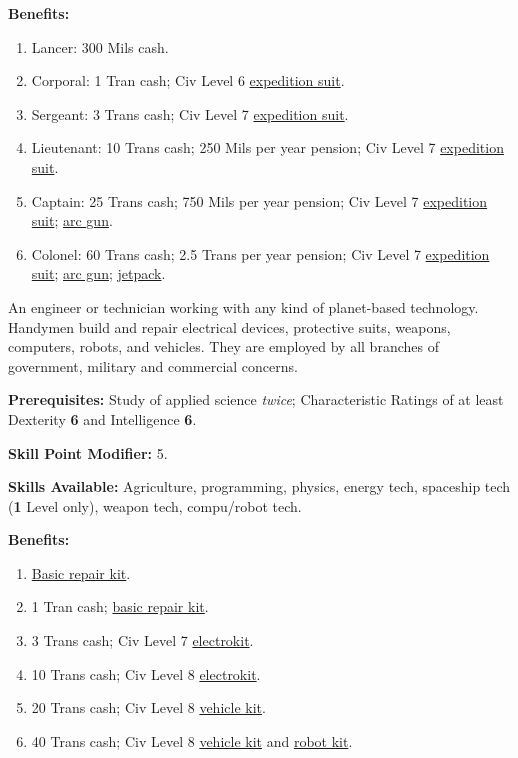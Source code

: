 \pagebreak[2]
\textbf{Benefits:}
\begin{enumerate}
\item Lancer: 300 Mils cash.
\item Corporal: 1 Tran cash; Civ Level 6 \hyperlink{tag:expedsuit}{expedition suit}.
\item Sergeant: 3 Trans cash; Civ Level 7 \hyperlink{tag:expedsuit}{expedition suit}.
\item Lieutenant: 10 Trans cash; 250 Mils per year pension; Civ Level
  7 \hyperlink{tag:expedsuit}{expedition suit}.
\item Captain: 25 Trans cash; 750 Mils per year pension; Civ Level 7
  \hyperlink{tag:expedsuit}{expedition suit}; \hyperlink{tag:arcgun}{arc gun}.
\item Colonel: 60 Trans cash; 2.5 Trans per year pension; Civ Level 7
  \hyperlink{tag:expedsuit}{expedition suit}; \hyperlink{tag:arcgun}{arc gun}; \hyperlink{tag:jetpack}{jetpack}.
\end{enumerate}

\bigskip

\pagebreak[2]

 \label{sec:prof-handyman}

An engineer or technician working with any kind of planet-based
technology. Handymen build and repair electrical devices, protective
suits, weapons, computers, robots, and vehicles. They are employed by
all branches of government, military and commercial concerns.

\textbf{Prerequisites:} Study of applied science \emph{twice}; Characteristic
Ratings of at least Dexterity \textbf{6} and Intelligence \textbf{6}.

\textbf{Skill Point Modifier:} 5.

\textbf{Skills Available:} Agriculture, programming, physics, energy
tech, spaceship tech (\textbf{1} Level only), weapon tech, compu/robot tech.

\pagebreak[2]
\textbf{Benefits:}
\begin{enumerate}
\item \hyperlink{tag:basicrepair}{Basic repair kit}. 
\item 1 Tran cash; \hyperlink{tag:basicrepair}{basic repair kit}.  
\item 3 Trans cash; Civ Level 7 \hyperlink{tag:electrokit}{electrokit}.   
\item 10 Trans cash; Civ Level 8 \hyperlink{tag:electrokit}{electrokit}.  
\item 20 Trans cash; Civ Level 8 \hyperlink{tag:vehiclekit}{vehicle kit}.  
\item 40 Trans cash; Civ Level 8 \hyperlink{tag:vehiclekit}{vehicle kit} and \hyperlink{tag:robotkit}{robot kit}.
\end{enumerate}

